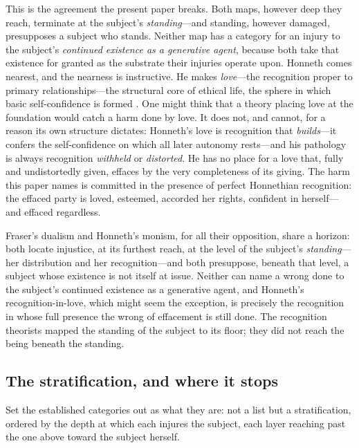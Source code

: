This is the agreement the present paper breaks. Both maps, however deep they reach, terminate at the subject's \emph{standing}---and standing, however damaged, presupposes a subject who stands. Neither map has a category for an injury to the subject's \emph{continued existence as a generative agent}, because both take that existence for granted as the substrate their injuries operate upon. Honneth comes nearest, and the nearness is instructive. He makes \emph{love}---the recognition proper to primary relationships---the structural core of ethical life, the sphere in which basic self-confidence is formed \parencite{honneth1995}. One might think that a theory placing love at the foundation would catch a harm done by love. It does not, and cannot, for a reason its own structure dictates: Honneth's love is recognition that \emph{builds}---it confers the self-confidence on which all later autonomy rests---and his pathology is always recognition \emph{withheld} or \emph{distorted}. He has no place for a love that, fully and undistortedly given, effaces by the very completeness of its giving. The harm this paper names is committed in the presence of perfect Honnethian recognition: the effaced party is loved, esteemed, accorded her rights, confident in herself---and effaced regardless.

\begin{claim}
Fraser's dualism and Honneth's monism, for all their opposition, share a horizon: both locate injustice, at its furthest reach, at the level of the subject's \emph{standing}---her distribution and her recognition---and both presuppose, beneath that level, a subject whose existence is not itself at issue. Neither can name a wrong done to the subject's continued existence as a generative agent, and Honneth's recognition-in-love, which might seem the exception, is precisely the recognition in whose full presence the wrong of effacement is still done. The recognition theorists mapped the standing of the subject to its floor; they did not reach the being beneath the standing.
\end{claim}

\subsection{The stratification, and where it stops}
\label{p18:sub:typ-strata}

Set the established categories out as what they are: not a list but a stratification, ordered by the depth at which each injures the subject, each layer reaching past the one above toward the subject herself.

